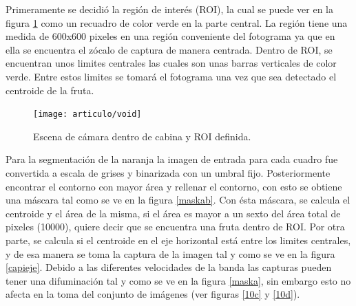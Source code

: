 \documentclass[twoside,spanish,ESP,MSc]{plantillaLabUPV}
\theoremstyle{definition}
\begin{document}
Primeramente se decidió la región de interés (ROI), la cual se puede ver en la figura \ref{fig:void} como un recuadro de color verde en la parte central. La región tiene una medida de 600x600 pixeles en una región conveniente del fotograma ya que en ella se encuentra el zócalo de captura de manera centrada. Dentro de ROI, se encuentran unos limites centrales las cuales son unas barras verticales de color verde. Entre estos limites se tomará el fotograma una vez que sea detectado el centroide de la fruta.

\begin{figure}
	\centering
	\texttt{[image: articulo/void]}
	\caption{Escena de cámara dentro de cabina y ROI definida.}
	\label{fig:void}
\end{figure}

Para la segmentación de la naranja la imagen de entrada para cada cuadro fue convertida a escala de grises y binarizada con un umbral fijo. Posteriormente encontrar el contorno con mayor área y rellenar el contorno, con esto se obtiene una máscara tal como se ve en la figura \ref{maskab}. Con ésta máscara, se calcula el centroide y el área de la misma, si el área es mayor a un sexto del área total de pixeles (10000), quiere decir que se encuentra una fruta dentro de ROI. Por otra parte, se calcula si el centroide en el eje horizontal está entre los limites centrales, y de esa manera se toma la captura de la imagen tal y como se ve en la figura \ref{capieje}. Debido a las diferentes velocidades de la banda las capturas pueden tener una difuminación tal y como se ve en la figura \ref{maska}, sin embargo esto no afecta en la toma del conjunto de imágenes (ver figuras \ref{10c} y \ref{10d}).
\end{document}
